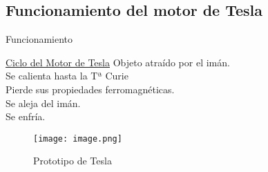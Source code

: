 \documentclass[10pt]{beamer}
\begin{document}
    \subsection{\textrm{Funcionamiento del motor de Tesla}}
        \begin{frame}{Funcionamiento}
            \begin{block}{\href{https://youtu.be/mjI2AOjIJMs?t=88}{Ciclo del Motor de Tesla}}
                Objeto atraído por el imán.\\
                Se calienta hasta la Tª Curie\\
                Pierde sus propiedades ferromagnéticas.\\
                Se aleja del imán.\\
                Se enfría. \\
            \end{block}
            
            \begin{figure}
                \centering
                \texttt{[image: image.png]}
                \caption{Prototipo de Tesla}
                \label{fig:my_label}
            \end{figure}
        \end{frame}


            
\end{document}
